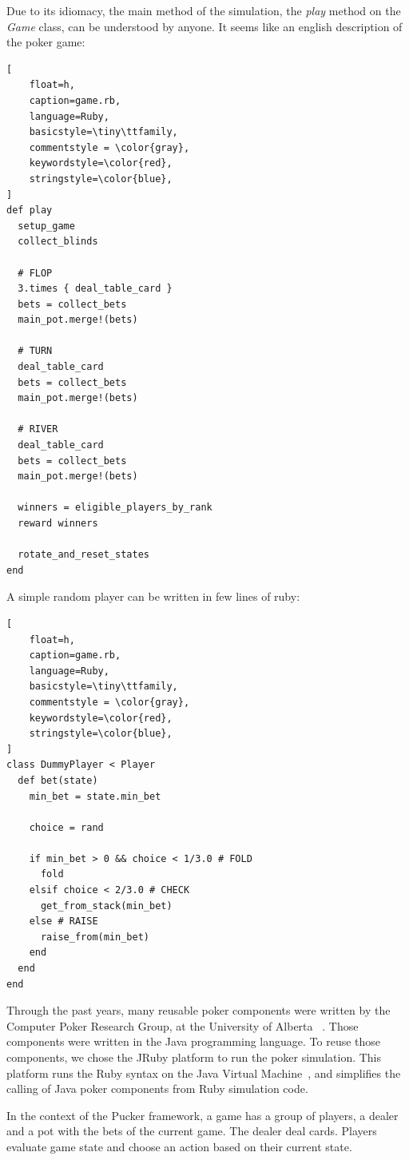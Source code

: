 Due to its idiomacy, the main method of the simulation, the \textit{play} method on the \textit{Game} class, can be understood by anyone. It seems like an english description of the poker game:

\begin{lstlisting}[
    float=h,
    caption=game.rb,
    language=Ruby,
    basicstyle=\tiny\ttfamily,
    commentstyle = \color{gray},
    keywordstyle=\color{red},
    stringstyle=\color{blue},
]
def play
  setup_game
  collect_blinds

  # FLOP
  3.times { deal_table_card }
  bets = collect_bets
  main_pot.merge!(bets)

  # TURN
  deal_table_card
  bets = collect_bets
  main_pot.merge!(bets)

  # RIVER
  deal_table_card
  bets = collect_bets
  main_pot.merge!(bets)

  winners = eligible_players_by_rank
  reward winners

  rotate_and_reset_states
end
\end{lstlisting}

A simple random player can be written in few lines of ruby:

\begin{lstlisting}[
    float=h,
    caption=game.rb,
    language=Ruby,
    basicstyle=\tiny\ttfamily,
    commentstyle = \color{gray},
    keywordstyle=\color{red},
    stringstyle=\color{blue},
]
class DummyPlayer < Player
  def bet(state)
    min_bet = state.min_bet

    choice = rand

    if min_bet > 0 && choice < 1/3.0 # FOLD
      fold
    elsif choice < 2/3.0 # CHECK
      get_from_stack(min_bet)
    else # RAISE
      raise_from(min_bet)
    end
  end
end
\end{lstlisting}

Through the past years, many reusable poker components were written by the Computer Poker Research Group, at the University of Alberta ~\cite{spaz.ca/poker/doc}. Those components were written in the Java programming language. To reuse those components, we chose the JRuby platform to run the poker simulation. This platform runs the Ruby syntax on the Java Virtual Machine~\cite{jruby.org}, and simplifies the calling of Java poker components from Ruby simulation code.

In the context of the Pucker framework, a game has a group of players, a dealer and a pot with the bets of the current game. The dealer deal cards. Players evaluate game state and choose an action based on their current state.

